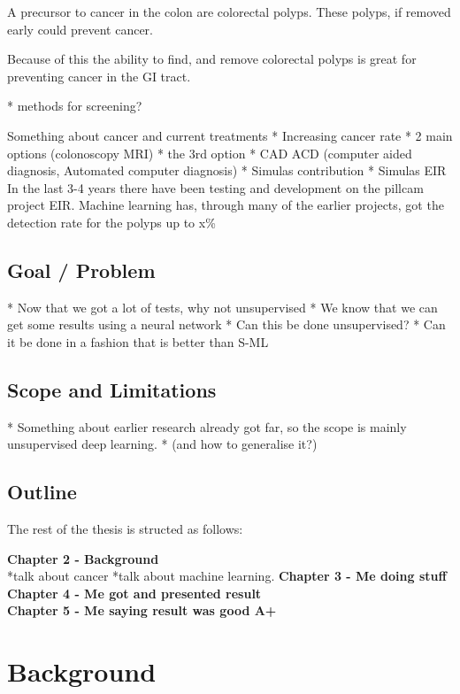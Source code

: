 \documentclass[a4paper,english]{ifimaster}
\begin{document}
	A precursor to cancer in the colon are colorectal polyps. These polyps, if removed early could prevent 
	cancer. 
		
	
	Because of this the ability to find, and remove colorectal polyps is great for preventing cancer in the GI tract. 
	
	* methods for screening?
	
	
		
		Something about cancer and current treatments 
		* Increasing cancer rate
		* 2 main options (colonoscopy MRI)
		* the 3rd option
		* CAD ACD (computer aided diagnosis, Automated computer diagnosis)
		* Simulas contribution
		* Simulas EIR
	In the last 3-4 years there have been testing and development on the pillcam project EIR. Machine learning has, through 
	many of the earlier projects, got the detection rate for the polyps up to x\% %
	
	
	\section{Goal / Problem}
	
		* Now that we got a lot of tests, why not unsupervised
		* We know that we can get some results using a neural network
		* Can this be done unsupervised?
		* Can it be done in a fashion that is better than S-ML
		 
		
		
	\section{Scope and Limitations}
		* Something about earlier research already got far, so the scope is mainly unsupervised deep learning.
		* (and how to generalise it?)
		
	
		

	\section{Outline}
	The rest of the thesis is structed as follows:
	
	\textbf{Chapter 2 - Background}\\
	*talk about cancer
	*talk about machine learning.
	\textbf{Chapter 3 - Me doing stuff}\\
	\textbf{Chapter 4 - Me got and presented result}\\
	\textbf{Chapter 5 - Me saying result was good A+}\\
	
		
\chapter{Background}
\end{document}
